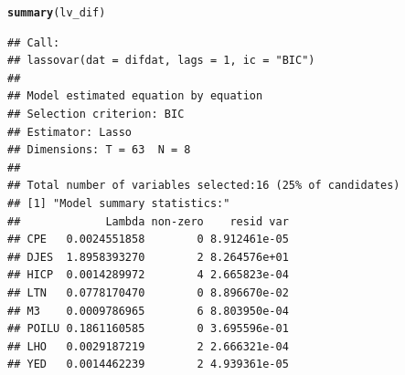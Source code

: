 \documentclass[11pt,oneside, a4paper]{amsart}\usepackage[]{graphicx}\usepackage[]{color}
\makeatletter
\newcommand{\hlstd}[1]{\textcolor[rgb]{0.345,0.345,0.345}{#1}}%
\newcommand{\hlkwd}[1]{\textcolor[rgb]{0.737,0.353,0.396}{\textbf{#1}}}%
\newenvironment{kframe}{%
 \def\at@end@of@kframe{}%
 \ifinner\ifhmode%
  \def\at@end@of@kframe{\end{minipage}}%
  \begin{minipage}{\columnwidth}%
 \fi\fi%
 \def\FrameCommand##1{\hskip\@totalleftmargin \hskip-\fboxsep
 \colorbox{shadecolor}{##1}\hskip-\fboxsep
     \hskip-\linewidth \hskip-\@totalleftmargin \hskip\columnwidth}%
 \MakeFramed {\advance\hsize-\width
   \@totalleftmargin\z@ \linewidth\hsize
   \@setminipage}}%
 {\par\unskip\endMakeFramed%
 \at@end@of@kframe}
\newenvironment{knitrout}{}{} %
\makeatother
\begin{document}
\begin{knitrout}
\begin{kframe}
\begin{alltt}
\hlkwd{summary}\hlstd{(lv_dif)}
\end{alltt}
\begin{verbatim}
## Call:
## lassovar(dat = difdat, lags = 1, ic = "BIC")
## 
## Model estimated equation by equation
## Selection criterion: BIC
## Estimator: Lasso
## Dimensions: T = 63  N = 8
## 
## Total number of variables selected:16 (25% of candidates)
## [1] "Model summary statistics:"
##             Lambda non-zero    resid var
## CPE   0.0024551858        0 8.912461e-05
## DJES  1.8958393270        2 8.264576e+01
## HICP  0.0014289972        4 2.665823e-04
## LTN   0.0778170470        0 8.896670e-02
## M3    0.0009786965        6 8.803950e-04
## POILU 0.1861160585        0 3.695596e-01
## LHO   0.0029187219        2 2.666321e-04
## YED   0.0014462239        2 4.939361e-05
\end{verbatim}
\end{kframe}
\end{knitrout}
\end{document}
